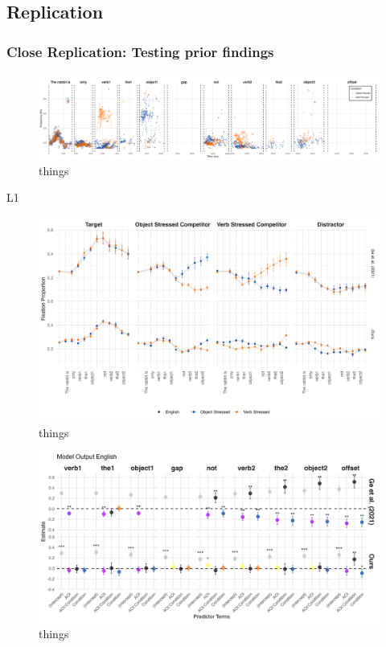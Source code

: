 \subsection{Replication}

\subsubsection{Close Replication: Testing prior findings}
\begin{figure}[H]  %
    \centering
    \includegraphics[width=\textwidth,height=\textheight,keepaspectratio]{viz/accoustic.png}
    \caption{things}
    \label{fig:acoustic}
\end{figure}

L1 

\begin{figure}[H]  %
    \centering
    \includegraphics[width=\textwidth,height=\textheight,keepaspectratio]{viz/english_fix.png}
    \caption{things}
    \label{fig:english_fix}
\end{figure}

\begin{figure}[H]  %
    \centering
    \includegraphics[width=\textwidth,height=\textheight,keepaspectratio]{viz/model_plot_english.png}
    \caption{things}
    \label{fig:model_plot_english}
\end{figure}

